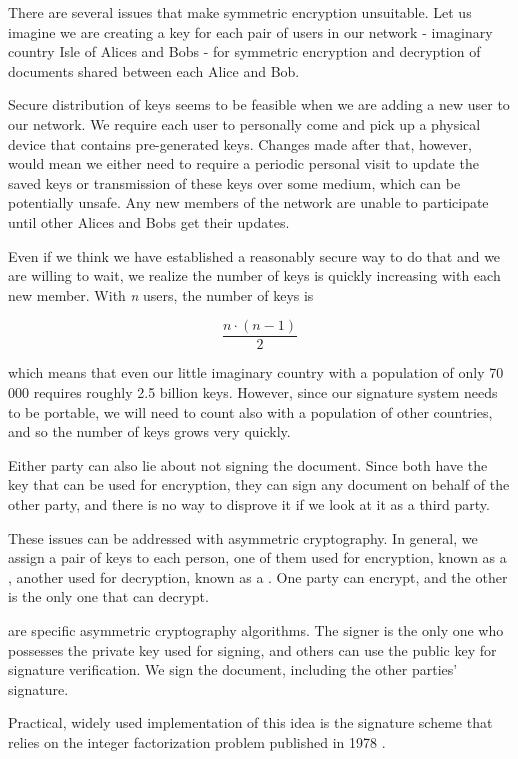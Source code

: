 \documentclass[thesismargins, english, thesislinespacing, onelinechapterstyle, upjsfrontpage]{rnthesis}
\begin{document}
There are several issues that make symmetric encryption unsuitable.
Let us imagine we are creating a key for each pair of users in our network - imaginary country Isle of Alices and Bobs - for symmetric encryption and decryption of documents shared between each Alice and Bob.

Secure distribution of keys seems to be feasible when we are adding a new user to our network.
We require each user to personally come and pick up a physical device that contains pre-generated keys.
Changes made after that, however, would mean we either need to require a periodic personal visit to update the saved keys or transmission of these keys over some medium, which can be potentially unsafe.
Any new members of the network are unable to participate until other Alices and Bobs get their updates.

Even if we think we have established a reasonably secure way to do that and we are willing to wait, we realize the number of keys is quickly increasing with each new member. With \textit{n} users, the number of keys is

$$\frac{n \cdot (n - 1)}{2}$$

which means that even our little imaginary country with a population of only 70 000 requires roughly 2.5 billion keys. However, since our signature system needs to be portable, we will need to count also with a population of other countries, and so the number of keys grows very quickly.

Either party can also lie about not signing the document.
Since both have the key that can be used for encryption, they can sign any document on behalf of the other party, and there is no way to disprove it if we look at it as a third party.

These issues can be addressed with asymmetric cryptography.
In general, we assign a pair of keys to each person, one of them used for encryption, known as a , another used for decryption, known as a .
One party can encrypt, and the other is the only one that can decrypt.

 are specific asymmetric cryptography algorithms.
The signer is the only one who possesses the private key used for signing, and others can use the public key for signature verification.
We sign the document, including the other parties' signature.

Practical, widely used implementation of this idea is the  signature scheme that relies on the integer factorization problem published in 1978 \cite{rsa}.
\end{document}
